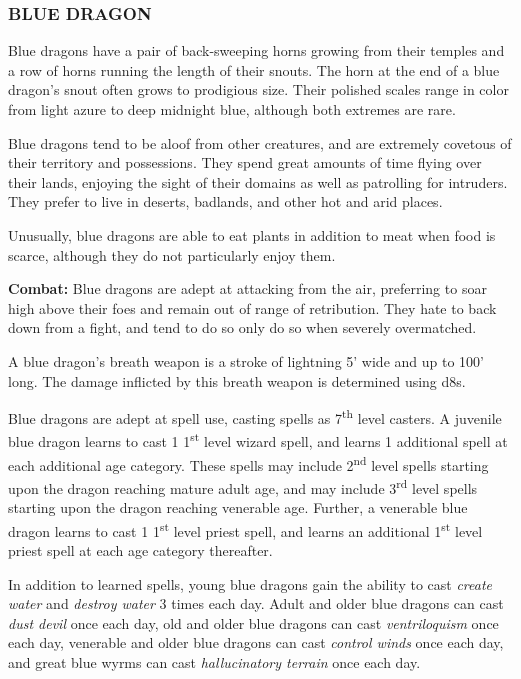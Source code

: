 \begin{multicols}{2}
\subsubsection{BLUE DRAGON}

Blue dragons have a pair of back-sweeping horns growing from their temples and a row of horns running the length of their snouts. The horn at the end of a blue dragon's snout often grows to prodigious size. Their polished scales range in color from light azure to deep midnight blue, although both extremes are rare.

Blue dragons tend to be aloof from other creatures, and are extremely covetous of their territory and possessions. They spend great amounts of time flying over their lands, enjoying the sight of their domains as well as patrolling for intruders. They prefer to live in deserts, badlands, and other hot and arid places.

Unusually, blue dragons are able to eat plants in addition to meat when food is scarce, although they do not particularly enjoy them.

\textbf{Combat:} Blue dragons are adept at attacking from the air, preferring to soar high above their foes and remain out of range of retribution. They hate to back down from a fight, and tend to do so only do so when severely overmatched.

A blue dragon's breath weapon is a stroke of lightning 5' wide and up to 100' long. The damage inflicted by this breath weapon is determined using d8s. 

Blue dragons are adept at spell use, casting spells as 7\textsuperscript{th} level casters. A juvenile blue dragon learns to cast 1 1\textsuperscript{st} level wizard spell, and learns 1 additional spell at each additional age category. These spells may include 2\textsuperscript{nd} level spells starting upon the dragon reaching mature adult age, and may include 3\textsuperscript{rd} level spells starting upon the dragon reaching venerable age. Further, a venerable blue dragon learns to cast 1 1\textsuperscript{st} level priest spell, and learns an additional 1\textsuperscript{st} level priest spell at each age category thereafter.

In addition to learned spells, young blue dragons gain the ability to cast \textit{create water} and \textit{destroy water} 3 times each day. Adult and older blue dragons can cast \textit{dust devil} once each day, old and older blue dragons can cast \textit{ventriloquism} once each day, venerable and older blue dragons can cast \textit{control winds} once each day, and great blue wyrms can cast \textit{hallucinatory terrain} once each day.


\end{multicols}
